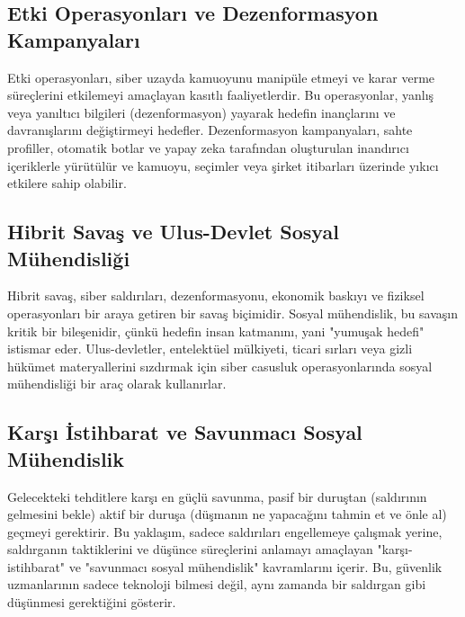 \subsection{Etki Operasyonları ve Dezenformasyon Kampanyaları}

Etki operasyonları, siber uzayda kamuoyunu manipüle etmeyi ve karar verme süreçlerini etkilemeyi amaçlayan kasıtlı faaliyetlerdir. Bu operasyonlar, yanlış veya yanıltıcı bilgileri (dezenformasyon) yayarak hedefin inançlarını ve davranışlarını değiştirmeyi hedefler. Dezenformasyon kampanyaları, sahte profiller, otomatik botlar ve yapay zeka tarafından oluşturulan inandırıcı içeriklerle yürütülür ve kamuoyu, seçimler veya şirket itibarları üzerinde yıkıcı etkilere sahip olabilir.

\subsection{Hibrit Savaş ve Ulus-Devlet Sosyal Mühendisliği}

Hibrit savaş, siber saldırıları, dezenformasyonu, ekonomik baskıyı ve fiziksel operasyonları bir araya getiren bir savaş biçimidir. Sosyal mühendislik, bu savaşın kritik bir bileşenidir, çünkü hedefin insan katmanını, yani "yumuşak hedefi" istismar eder. Ulus-devletler, entelektüel mülkiyeti, ticari sırları veya gizli hükümet materyallerini sızdırmak için siber casusluk operasyonlarında sosyal mühendisliği bir araç olarak kullanırlar.

\subsection{Karşı İstihbarat ve Savunmacı Sosyal Mühendislik}

Gelecekteki tehditlere karşı en güçlü savunma, pasif bir duruştan (saldırının gelmesini bekle) aktif bir duruşa (düşmanın ne yapacağını tahmin et ve önle al) geçmeyi gerektirir. Bu yaklaşım, sadece saldırıları engellemeye çalışmak yerine, saldırganın taktiklerini ve düşünce süreçlerini anlamayı amaçlayan "karşı-istihbarat" ve "savunmacı sosyal mühendislik" kavramlarını içerir. Bu, güvenlik uzmanlarının sadece teknoloji bilmesi değil, aynı zamanda bir saldırgan gibi düşünmesi gerektiğini gösterir.


